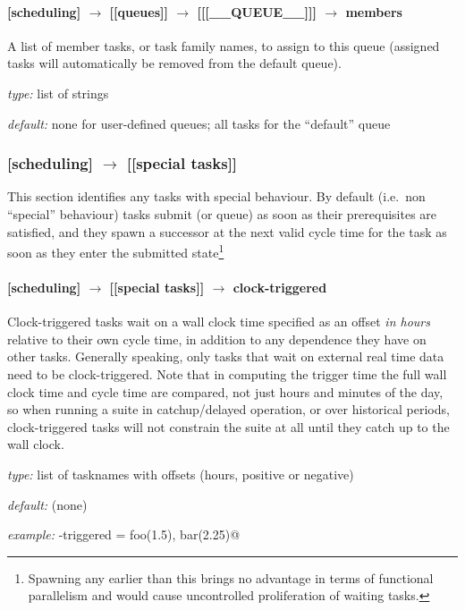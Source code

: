 \paragraph[members]{[scheduling] $\rightarrow$ [[queues]] $\rightarrow$ [[[\_\_QUEUE\_\_]]] $\rightarrow$ members}

A list of member tasks, or task family names, to assign to this queue
(assigned tasks will automatically be removed from the default queue).
\begin{myitemize}
\item {\em type:} list of strings
\item {\em default:} none for user-defined queues; all tasks for the ``default'' queue
\end{myitemize}

\subsubsection[{[[}special tasks{]]}]{[scheduling] $\rightarrow$ [[special tasks]]}

This section identifies any tasks with special behaviour. By default
(i.e.\ non ``special'' behaviour) tasks submit (or queue) as soon as
their prerequisites are satisfied, and they spawn a successor at the
next valid cycle time for the task as soon as they enter the submitted 
state\footnote{Spawning any earlier than this brings no advantage in
terms of functional parallelism and would cause uncontrolled
proliferation of waiting tasks.}

\paragraph[clock-triggered]{[scheduling] $\rightarrow$ [[special tasks]] $\rightarrow$ clock-triggered}

Clock-triggered tasks wait on a wall clock time specified as an offset
{\em in hours} relative to their own cycle time, in addition to any
dependence they have on other tasks. Generally speaking, only tasks that
wait on external real time data need to be clock-triggered.  Note that
in computing the trigger time the full wall clock time and cycle time
are compared, not just hours and minutes of the day, so when running a
suite in catchup/delayed operation, or over historical periods,
clock-triggered tasks will not constrain the suite at all until they
catch up to the wall clock.

\begin{myitemize}
    \item {\em type:} list of tasknames with offsets (hours, positive or negative)
    \item {\em default:} (none)
    \item {\em example:} \lstinline@clock-triggered = foo(1.5), bar(2.25)@
\end{myitemize}


